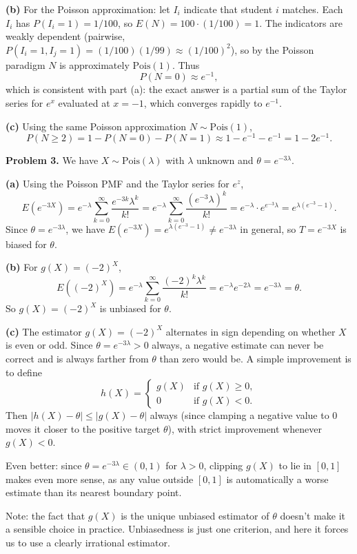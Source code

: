 \documentclass{article}
\begin{document}
\textbf{(b)} For the Poisson approximation: let $I_i$ indicate that student $i$ matches. Each $I_i$ has $P(I_i=1)=1/100$, so $E(N)=100\cdot(1/100)=1$. The indicators are weakly dependent (pairwise, $P(I_i=1, I_j=1)=(1/100)(1/99)\approx(1/100)^2$), so by the Poisson paradigm $N$ is approximately $\text{Pois}(1)$. Thus
$$
P(N=0) \approx e^{-1},
$$
which is consistent with part (a): the exact answer is a partial sum of the Taylor series for $e^x$ evaluated at $x=-1$, which converges rapidly to $e^{-1}$.

\textbf{(c)} Using the same Poisson approximation $N\sim\text{Pois}(1)$,
$$
P(N \ge 2) = 1 - P(N=0) - P(N=1) \approx 1 - e^{-1} - e^{-1} = 1 - 2e^{-1}.
$$

\bigskip
\textbf{Problem 3.} We have $X\sim\text{Pois}(\lambda)$ with $\lambda$ unknown and $\theta = e^{-3\lambda}$.

\textbf{(a)} Using the Poisson PMF and the Taylor series for $e^z$,
$$
E(e^{-3X}) = e^{-\lambda}\sum_{k=0}^{\infty}\frac{e^{-3k}\lambda^k}{k!} = e^{-\lambda}\sum_{k=0}^{\infty}\frac{(e^{-3}\lambda)^k}{k!} = e^{-\lambda}\cdot e^{e^{-3}\lambda} = e^{\lambda(e^{-3}-1)}.
$$
Since $\theta = e^{-3\lambda}$, we have $E(e^{-3X}) = e^{\lambda(e^{-3}-1)} \ne e^{-3\lambda}$ in general, so $T=e^{-3X}$ is biased for $\theta$.

\textbf{(b)} For $g(X) = (-2)^X$,
$$
E((-2)^X) = e^{-\lambda}\sum_{k=0}^{\infty}\frac{(-2)^k \lambda^k}{k!} = e^{-\lambda} e^{-2\lambda} = e^{-3\lambda} = \theta.
$$
So $g(X)=(-2)^X$ is unbiased for $\theta$.

\textbf{(c)} The estimator $g(X)=(-2)^X$ alternates in sign depending on whether $X$ is even or odd. Since $\theta = e^{-3\lambda} > 0$ always, a negative estimate can never be correct and is always farther from $\theta$ than zero would be. A simple improvement is to define
$$
h(X) = \begin{cases} g(X) & \text{if } g(X) \ge 0, \\ 0 & \text{if } g(X) < 0. \end{cases}
$$
Then $|h(X) - \theta| \le |g(X) - \theta|$ always (since clamping a negative value to $0$ moves it closer to the positive target $\theta$), with strict improvement whenever $g(X) < 0$.

Even better: since $\theta = e^{-3\lambda} \in (0,1)$ for $\lambda > 0$, clipping $g(X)$ to lie in $[0,1]$ makes even more sense, as any value outside $[0,1]$ is automatically a worse estimate than its nearest boundary point.

Note: the fact that $g(X)$ is the unique unbiased estimator of $\theta$ doesn't make it a sensible choice in practice. Unbiasedness is just one criterion, and here it forces us to use a clearly irrational estimator.
\end{document}
